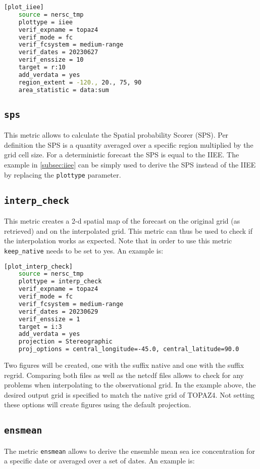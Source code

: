 \documentclass[DIV=10, parskip=full]{scrreprt}
\begin{document}
\begin{lstlisting}[language=bash]
	[plot_iiee]
	source = nersc_tmp
	plottype = iiee
	verif_expname = topaz4
	verif_mode = fc
	verif_fcsystem = medium-range
	verif_dates = 20230627
	verif_enssize = 10
	target = r:10
	add_verdata = yes
	region_extent = -120., 20., 75, 90
	area_statistic = data:sum
\end{lstlisting}

\subsection{\texttt{sps}}
This metric allows to calculate the Spatial probability Scorer (SPS). Per definition the SPS is a quantity averaged over a specific region multiplied by the grid cell size. For a deterministic forecast the SPS is equal to the IIEE. The example in \ref{subsec:iiee} can be simply used to derive the SPS instead of the IIEE by replacing the \texttt{plottype} parameter. 

\subsection{\texttt{interp\_check}}
This metric creates a 2-d spatial map of the forecast on the original grid (as retrieved) and on the interpolated grid. This metric can thus be used to check if the interpolation works as expected. Note that in order to use this metric \texttt{keep\_native} needs to be set to yes. An example is:

\begin{lstlisting}[language=bash]
	[plot_interp_check]
	source = nersc_tmp
	plottype = interp_check
	verif_expname = topaz4
	verif_mode = fc
	verif_fcsystem = medium-range
	verif_dates = 20230629
	verif_enssize = 1
	target = i:3
	add_verdata = yes
	projection = Stereographic
	proj_options = central_longitude=-45.0, central_latitude=90.0
\end{lstlisting}

Two figures will be created, one with the suffix native and one with the suffix regrid. Comparing both files as well as the netcdf files allows to check for any problems when interpolating to the observational grid. In the example above, the desired output grid is specified to match the native grid of TOPAZ4. Not setting these options will create figures using the default projection.   

\subsection{\texttt{ensmean}}
The metric \texttt{ensmean} allows to derive the ensemble mean sea ice concentration for a specific date or averaged over a set of dates. An example is:
\end{document}

